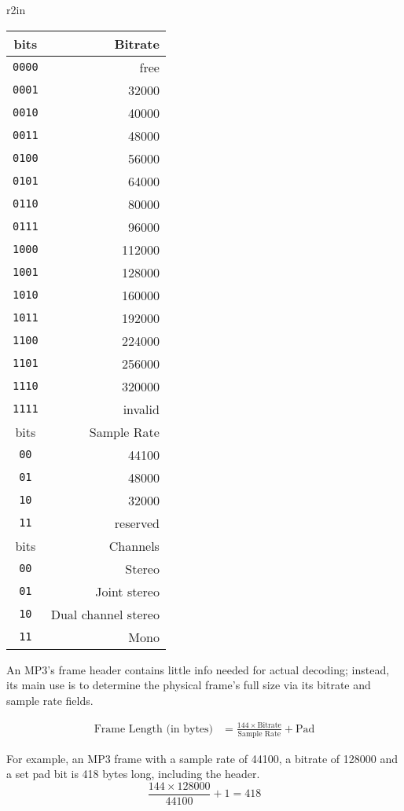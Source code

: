 \documentclass[letter]{scrbook}
\begin{document}
\begin{wrapfigure}[20]{r}{2in}
\begin{tabular}{|c|r|}
\hline
bits & Bitrate \\
\hline
\texttt{0000} & free \\
\texttt{0001} & 32000 \\
\texttt{0010} & 40000 \\
\texttt{0011} & 48000 \\
\texttt{0100} & 56000 \\
\texttt{0101} & 64000 \\
\texttt{0110} & 80000 \\
\texttt{0111} & 96000 \\
\texttt{1000} & 112000 \\
\texttt{1001} & 128000 \\
\texttt{1010} & 160000 \\
\texttt{1011} & 192000 \\
\texttt{1100} & 224000 \\
\texttt{1101} & 256000 \\
\texttt{1110} & 320000 \\
\texttt{1111} & invalid \\
\hline
\hline
bits & Sample Rate \\
\hline
\texttt{00} & 44100 \\
\texttt{01} & 48000 \\
\texttt{10} & 32000 \\
\texttt{11} & reserved \\
\hline
\hline
bits & Channels \\
\hline
\texttt{00} & Stereo \\
\texttt{01} & Joint stereo \\
\texttt{10} & Dual channel stereo\\
\texttt{11} & Mono \\
\hline
\end{tabular}
\end{wrapfigure}

An MP3's frame header contains little info needed for actual decoding;
instead, its main use is to determine the physical frame's full size
via its bitrate and sample rate fields.

\begin{align*}
\text{Frame Length (in bytes)} &= \frac{144 \times \text{Bitrate}}{\text{Sample Rate}} + \text{Pad}
\end{align*}
\par
\noindent
For example, an MP3 frame with a sample rate of 44100,
a bitrate of 128000 and a set pad bit is 418 bytes long, including the header.
\begin{equation*}
\frac{144 \times 128000}{44100} + 1 = 418
\end{equation*}
\end{document}

